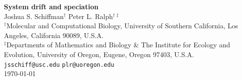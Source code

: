 \documentclass{article}
\newcommand{\1}{\mathbbm{1}}
\begin{document}
\linenumbers

{\centering
{\Huge \bf System drift and speciation} \\ \vspace{0.75cm}
Joshua S. Schiffman$^{\dagger}$ \qquad Peter L. Ralph$^{\dagger \ddagger}$ \\ \vspace{0.5cm}
$^{\dagger}${\footnotesize {Molecular and Computational Biology, University of Southern California, Los Angeles, California 90089, U.S.A. \\
$^{\ddagger}$Departments of Mathematics and Biology \& The Institute for Ecology and Evolution, University of Oregon, Eugene, Oregon 97403, U.S.A.}} \\ \vspace{0.5cm}
{\small \texttt{jsschiff@usc.edu} \qquad 
\texttt{plr@uoregon.edu}} \\ \vspace{0.5cm}
\small \today \\
\vspace{0.25cm}
}

%
%
%
%
%
%
%
%
%
%
%
%
%
%
%
\end{document}
